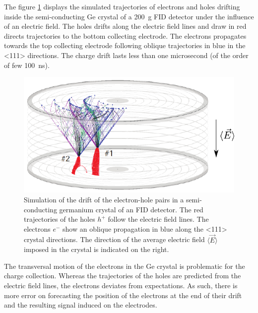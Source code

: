 The figure \ref{fig:oblique-propagation} displays the simulated \cite{Broniatowski2014} trajectories of electrons and holes drifting inside the semi-conducting Ge crystal of a \SI{200}{\g} \Edelweiss{} FID detector under the influence of an electric field. The holes drifts along the electric field lines and draw in red directs trajectories to the bottom collecting electrode. The electrons propagates towards the top collecting electrode following oblique trajectories in blue in the <111> directions.
The charge drift lasts less than one microsecond (of the order of few \SI{100}{\nano\second}).

\begin{figure}
\centering
\includegraphics[scale=1]{Figures/Electrodes/transversal_trajectories.pdf}
\caption{Simulation of the drift of the electron-hole pairs in a semi-conducting germanium crystal of an \Edelweiss{} FID detector. The red trajectories of the holes $h^+$ follow the electric field lines. The electrons $e^-$ show an oblique propagation in blue along the <111> crystal directions. The direction of the average electric field $\langle \vec{E} \rangle$ imposed in the crystal is indicated on the right.}
\label{fig:oblique-propagation}
\end{figure}

The transversal motion of the electrons in the Ge crystal is problematic for the charge collection. Whereas the trajectories of the holes are predicted from the electric field lines, the electrons deviates from expectations. As such, there is more error on forecasting the position of the electrons at the end of their drift and the resulting signal induced on the electrodes. 

